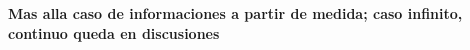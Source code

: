 \label{sec:SZ:Cuanticas}

{\bf Mas alla caso de informaciones a partir de medida; caso infinito, continuo queda en discusiones}